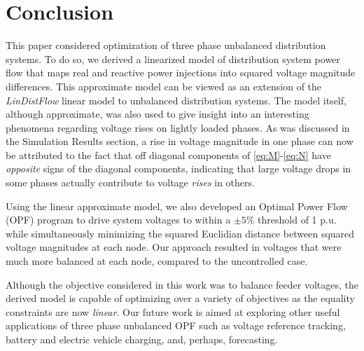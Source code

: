 \section{Conclusion}

This paper considered optimization of three phase unbalanced distribution systems.  To do so, we derived a linearized model of distribution system power flow that maps real and reactive power injections into squared voltage magnitude differences.  This approximate model can be viewed as an extension of the \emph{LinDistFlow} \cite{baran1989optimal} linear model to unbalanced distribution systems.  The model itself, although approximate, was also used to give insight into an interesting phenomena regarding voltage rises on lightly loaded phases.  As was discussed in the Simulation Results section, a rise in voltage magnitude in one phase can now be attributed to the fact that off diagonal components of \eqref{eq:M}-\eqref{eq:N} have \emph{opposite} signs of the diagonal components, indicating that large voltage drops in some phases actually contribute to voltage \emph{rises} in others.

Using the linear approximate model, we also developed an Optimal Power Flow (OPF) program to drive system voltages to within a $\pm 5\%$ threshold of 1 p.u. while simultaneously minimizing the squared Euclidian distance between squared voltage magnitudes at each node. Our approach resulted in voltages that were much more balanced at each node, compared to the uncontrolled case.

Although the objective considered in this work was to balance feeder voltages, the derived model is capable of optimizing over a variety of objectives as the equality constraints are now \emph{linear}.  Our future work is aimed at exploring other useful applications of three phase unbalanced OPF such as voltage reference tracking, battery and electric vehicle charging, and, perhaps, forecasting.